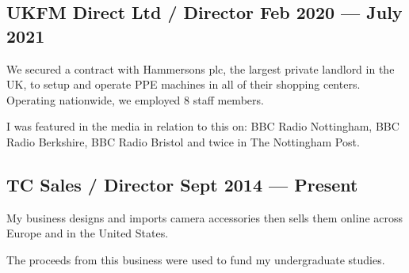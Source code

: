 \subsection{{UKFM Direct Ltd / Director \hfill Feb 2020 --- July 2021}}
\begin{zitemize}
\item We secured a contract with Hammersons plc, the largest private landlord in the UK, to setup and operate PPE machines in all of their shopping centers. Operating nationwide, we employed 8 staff members.
\item I was featured in the media in relation to this on: BBC Radio Nottingham, BBC Radio Berkshire, BBC Radio Bristol and twice in The Nottingham Post.
\end{zitemize}

\subsection{{TC Sales / Director \hfill Sept 2014 --- Present}}
\begin{zitemize}
\item My business designs and imports camera accessories then sells them online across Europe and in the United States.
\item The proceeds from this business were used to fund my undergraduate studies.
\end{zitemize}
